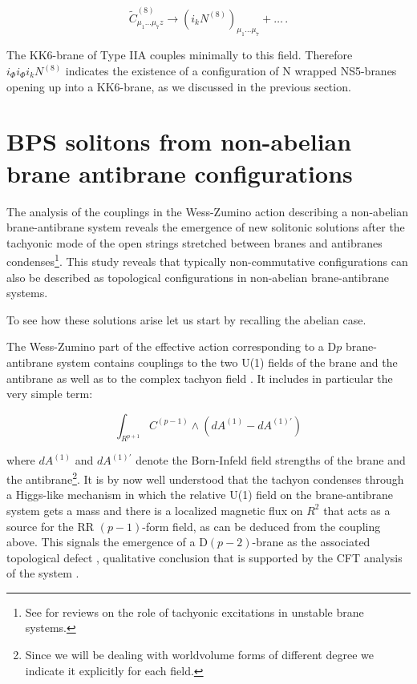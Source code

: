 \documentclass[12pt,a4paper]{article}
\begin{document}
\begin{equation}
{\tilde C}^{(8)}_{\mu_1\dots\mu_7 z}\rightarrow 
(i_k N^{(8)})_{\mu_1\dots\mu_7}+\dots\, .
\end{equation}

\noindent The KK6-brane of Type IIA couples
minimally to this field.
Therefore $i_\Phi i_\Phi i_k N^{(8)}$ indicates the existence
of a configuration of
N wrapped NS5-branes opening up into a KK6-brane, as we discussed in
the previous section.



\section{BPS solitons from non-abelian brane antibrane configurations}

The analysis of the couplings in the Wess-Zumino action 
describing a non-abelian 
brane-antibrane system reveals the emergence of new solitonic solutions
after the tachyonic mode of the open strings stretched between branes and
antibranes condenses\footnote{See \cite{reviews} for reviews on the role
of tachyonic excitations in unstable brane systems.}.  
This study reveals that typically non-commutative configurations can
also be described as topological configurations in non-abelian
brane-antibrane systems.

To see how these solutions arise let us start by recalling the abelian case. 

The Wess-Zumino part of the
effective action corresponding to a D$p$ brane-antibrane system 
contains couplings to the two U(1) fields of the brane and the 
antibrane as
well as to the complex tachyon field \cite{KW}. It includes in 
particular the very simple term:

\begin{equation}
\int_{R^{p+1}}C^{(p-1)}\wedge (dA^{(1)}-dA^{(1)\prime})
\end{equation}

\noindent where $dA^{(1)}$ and $dA^{(1)\prime}$ denote the 
Born-Infeld field strengths of the brane and the 
antibrane\footnote{Since we will be dealing with worldvolume
forms of different degree we indicate it explicitly for each
field.}. 
It is by now well understood that the tachyon condenses through
a Higgs-like mechanism in which the relative
U(1) field on the brane-antibrane system gets a mass 
and there is a localized magnetic
flux on $R^2$ that acts as a
source for the RR $(p-1)$-form field, 
as can be deduced from
the coupling above. This signals the emergence of a D$(p-2)$-brane
as the associated topological defect \cite{Sen1}, 
qualitative conclusion that is supported 
by the CFT analysis of the system \cite{Sen2,MS}.
\end{document}
